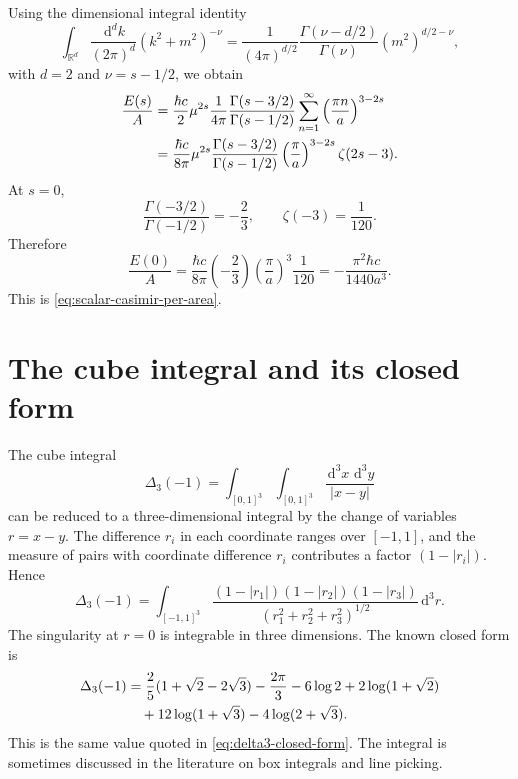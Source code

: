 \documentclass[11pt]{article}
\newcommand{\R}{\mathbb{R}}
\newcommand{\dd}{\,\mathrm{d}}
\begin{document}
Using the dimensional integral identity
\begin{equation}
    \int_{\R^d}\frac{\dd^dk}{(2\pi)^d}(k^2+m^2)^{-\nu}
    =\frac{1}{(4\pi)^{d/2}}\frac{\Gamma(\nu-d/2)}{\Gamma(\nu)}(m^2)^{d/2-\nu},
    \label{eq:dimensional-integral}
\end{equation}
with $d=2$ and $\nu=s-1/2$, we obtain
\begin{align}
    \frac{E(s)}{A}
    &=\frac{\hbar c}{2}\mu^{2s}\frac{1}{4\pi}
      \frac{\Gamma(s-3/2)}{\Gamma(s-1/2)}
      \sum_{n=1}^{\infty}
      \left(\frac{\pi n}{a}\right)^{3-2s}
      \notag\\
    &=\frac{\hbar c}{8\pi}\mu^{2s}
      \frac{\Gamma(s-3/2)}{\Gamma(s-1/2)}
      \left(\frac{\pi}{a}\right)^{3-2s}\zeta(2s-3).
    \label{eq:plate-zeta-expression}
\end{align}
At $s=0$,
\[
    \frac{\Gamma(-3/2)}{\Gamma(-1/2)}=-\frac{2}{3},
    \qquad
    \zeta(-3)=\frac{1}{120}.
\]
Therefore
\begin{equation}
    \frac{E(0)}{A}
    =\frac{\hbar c}{8\pi}\left(-\frac{2}{3}\right)
     \left(\frac{\pi}{a}\right)^3\frac{1}{120}
    =-\frac{\pi^2\hbar c}{1440a^3}.
    \label{eq:scalar-plate-result-app}
\end{equation}
This is \eqref{eq:scalar-casimir-per-area}.

\section{The cube integral and its closed form}
\label{app:box-integral}

The cube integral
\[
    \Delta_3(-1)=\int_{[0,1]^3}\int_{[0,1]^3}\frac{\dd^3x\,\dd^3y}{|x-y|}
\]
can be reduced to a three-dimensional integral by the change of variables $r=x-y$.  The difference $r_i$ in each coordinate ranges over $[-1,1]$, and the measure of pairs with coordinate difference $r_i$ contributes a factor $(1-|r_i|)$.  Hence
\begin{equation}
    \Delta_3(-1)
    =\int_{[-1,1]^3}\frac{(1-|r_1|)(1-|r_2|)(1-|r_3|)}{(r_1^2+r_2^2+r_3^2)^{1/2}}\dd^3r.
    \label{eq:delta-reduced}
\end{equation}
The singularity at $r=0$ is integrable in three dimensions.  The known closed form is
\begin{align}
\Delta_3(-1)
&=\frac{2}{5}(1+\sqrt2-2\sqrt3)-\frac{2\pi}{3}-6\log2+2\log(1+\sqrt2)
\notag\\
&\quad+12\log(1+\sqrt3)-4\log(2+\sqrt3).
\end{align}
This is the same value quoted in \eqref{eq:delta3-closed-form}.  The integral is sometimes discussed in the literature on box integrals and line picking.
\end{document}
